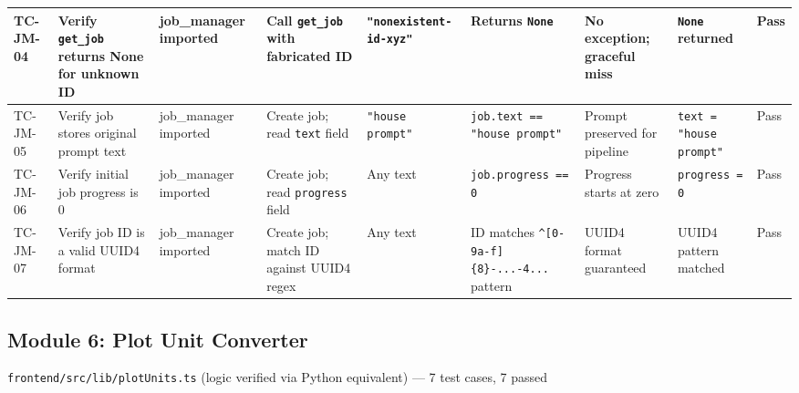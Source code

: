 \begin{landscape}
\begin{longtable}{|p{1.4cm}|p{3.2cm}|p{2.8cm}|p{2.8cm}|p{2.8cm}|p{2.8cm}|p{2.6cm}|p{2.8cm}|p{1.0cm}|}
\rowcolor{passgreen}
TC-JM-04 & Verify \texttt{get\_job} returns None for unknown ID & job\_manager imported & Call \texttt{get\_job} with fabricated ID & \texttt{"nonexistent-id-xyz"} & Returns \texttt{None} & No exception; graceful miss & \texttt{None} returned & Pass \\ \hline

\rowcolor{passgreen}
TC-JM-05 & Verify job stores original prompt text & job\_manager imported & Create job; read \texttt{text} field & \texttt{"house prompt"} & \texttt{job.text == "house prompt"} & Prompt preserved for pipeline & \texttt{text = "house prompt"} & Pass \\ \hline

\rowcolor{passgreen}
TC-JM-06 & Verify initial job progress is 0 & job\_manager imported & Create job; read \texttt{progress} field & Any text & \texttt{job.progress == 0} & Progress starts at zero & \texttt{progress = 0} & Pass \\ \hline

\rowcolor{passgreen}
TC-JM-07 & Verify job ID is a valid UUID4 format & job\_manager imported & Create job; match ID against UUID4 regex & Any text & ID matches \texttt{\^{}[0-9a-f]\{8\}-...-4...} pattern & UUID4 format guaranteed & UUID4 pattern matched & Pass \\ \hline

\end{longtable}
\end{landscape}

\subsection{Module 6: Plot Unit Converter}
\texttt{frontend/src/lib/plotUnits.ts} (logic verified via Python equivalent) — 7 test cases, 7 passed

